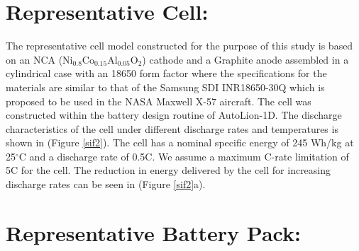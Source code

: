 \documentclass{achemso}
\begin{document}
\section*{Representative Cell:}
\vspace{-0.5cm}
The representative cell model constructed for the purpose of this study is based on an NCA ($\mathrm{Ni_{0.8}Co_{0.15}Al_{0.05}O_{2}}$) cathode and a Graphite anode assembled in a cylindrical case with an 18650 form factor where the specifications for the materials are similar to that of the Samsung SDI INR18650-30Q which is proposed to be used in the NASA Maxwell X-57 aircraft.  The cell was constructed within the battery design routine of AutoLion-1D.\cite{kalupson2013autolion} The discharge characteristics of the cell under different discharge rates and temperatures is shown in (Figure \ref{sif2}).  The cell has a nominal specific energy of 245 Wh/kg at 25$^\circ$C and a discharge rate of 0.5C.  We assume a maximum C-rate limitation of 5C for the cell. The reduction in energy delivered by the cell for increasing discharge rates can be seen in (Figure \ref{sif2}a). 

\vspace{-1.6cm}
\section*{Representative Battery Pack:}
\vspace{-0.5cm}
\end{document}
